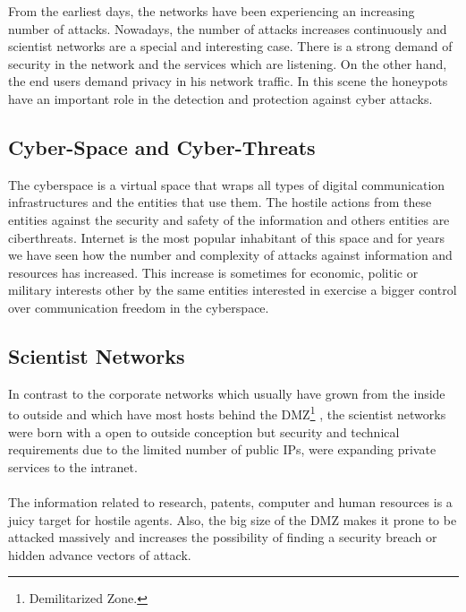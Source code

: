 \documentclass[a4paper]{llncs}
\begin{document}
From the earliest days, %
  the networks have been experiencing an increasing number of
  attacks. Nowadays, %
 the number of attacks increases continuously and scientist networks
 are a special and interesting case. %
 There is a strong demand of security in the network and the services which are listening. On the other hand, the end users demand privacy in his network traffic. In this scene the honeypots have an important role in the detection and protection against cyber attacks.

\subsection{Cyber-Space and Cyber-Threats}
\label{sect:Scientist Networks}

The cyberspace is a virtual space that wraps all types of digital
communication  infrastructures and the entities that use them. The
hostile actions from these entities against the security and safety of
the information and others entities are ciberthreats. Internet is the
most popular inhabitant of this space and for years we have seen how
the number and complexity of attacks against information and resources
has increased. This increase is sometimes for economic, politic or
military interests other by the same entities interested in exercise a
bigger control over communication freedom in the cyberspace.  %


\subsection{Scientist Networks}
\label{sect:Scientist Networks}
In contrast to the corporate networks which usually have grown from
the inside to outside  %
and which have  most hosts  behind the DMZ\footnote{Demilitarized
  Zone.} %
, the scientist networks were born with a open %
to outside conception but security and technical requirements due to
the limited number of public IPs, were expanding private services to
the intranet.\\\\The information related to research, patents,
computer and human resources is a juicy target for hostile agents. %
Also, the big size of the DMZ %
 makes it prone to be attacked massively and increases the possibility of finding a security breach or hidden advance vectors of attack.
\end{document}
